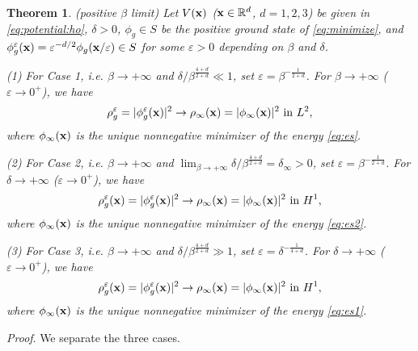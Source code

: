 \documentclass{elsarticle}
\newcommand{\vep}{\varepsilon}
\newcommand{\be}{\begin{equation}}
\newcommand{\ee}{\end{equation}}
\newtheorem{theorem}{Theorem}[section]
\newcommand{\bx}{{\bf x} }
\begin{document}
\begin{theorem}\label{thm:TFp}(positive $\beta$ limit) Let $V(\bx)$ ($\bx\in\Bbb R^d$, $d=1,2,3$) be given in \eqref{eq:potential:ho}, $\delta>0$, $\phi_g\in S$ be the positive ground state of \eqref{eq:minimize},
and $\phi_g^\vep(\bx)=\vep^{-d/2}\phi_g(\bx/\vep)\in S$ for some $\vep>0$ depending on $\beta$ and $\delta$.

(1) For Case 1, i.e. $\beta\to +\infty$ and $\delta/\beta^{\frac{4+d}{2+d}}\ll1$, set %
$\vep=\beta^{-\frac{1}{2+d}}$. For $\beta\to+\infty$ ($\vep\to0^+$),  we have
\be
\rho_g^\vep=|\phi_g^\vep(\bx)|^2\rightarrow\rho_\infty(\bx)=|\phi_\infty(\bx)|^2 \text{ in } L^2,
\ee
where $\phi_\infty(\bx)$ is the unique nonnegative minimizer of the energy \eqref{eq:es}.

(2) For Case 2, i.e. $\beta\to+\infty$ and %
$\lim_{\beta\to+\infty}
\delta/\beta^{\frac{4+d}{2+d}}=\delta_\infty>0$,
set %
$\vep=\beta^{-\frac{1}{2+d}}$. For $\delta\to+\infty$ ($\vep\to 0^+$), we have
\be
\rho_g^\vep(\bx)=|\phi_g^\vep(\bx)|^2 \rightarrow \rho_\infty(\bx)=|\phi_\infty(\bx)|^2 \text{ in } H^1,
\ee
where $\phi_\infty(\bx)$ is the unique nonnegative minimizer of the energy \eqref{eq:es2}.

(3) For Case 3, i.e. $\beta\to+\infty$ and $\delta/\beta^{\frac{4+d}{2+d}}\gg1$,  set
$\vep=\delta^{-\frac{1}{4+d}}$. For $\delta\to+\infty$ ($\vep\to 0^+$), we have
\be
\rho_g^\vep(\bx)=|\phi_g^\vep(\bx)|^2\rightarrow\rho_\infty(\bx)=|\phi_\infty(\bx)|^2 \text{ in } H^1,
\ee
where $\phi_\infty(\bx)$ %
 is the unique nonnegative minimizer of the energy \eqref{eq:es1}.

\end{theorem}
{\noindent\it Proof}. We separate the three cases.
\end{document}
